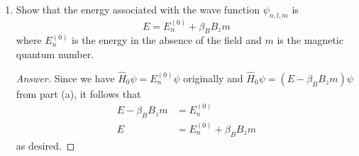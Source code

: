 \documentclass[../psets.tex]{subfiles}
\begin{document}
\begin{enumerate}
\begin{enumerate}
\begin{proof}[Answer]
        \end{proof}
        \item Show that the energy associated with the wave function $\psi_{n,l,m}$ is
        \begin{equation*}
            E = E_n^{(0)}+\beta_BB_zm
        \end{equation*}
        where $E_n^{(0)}$ is the energy in the absence of the field and $m$ is the magnetic quantum number.
        \begin{proof}[Answer]
            Since we have $\hat{H}_0\psi=E_n^{(0)}\psi$ originally and $\hat{H}_0\psi=(E-\beta_BB_zm)\psi$ from part (a), it follows that
            \begin{align*}
                E-\beta_BB_zm &= E_n^{(0)}\\
                E &= E_n^{(0)}+\beta_BB_zm
            \end{align*}
            as desired.
        \end{proof}
    \end{enumerate}
\end{enumerate}
\end{document}
